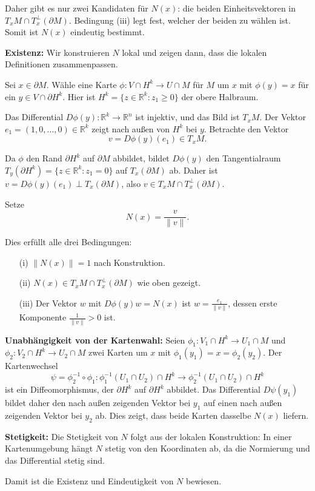 \documentclass{article}
\newcommand{\R}{\mathbb{R}}
\newcommand{\del}{\partial}
\begin{document}
Daher gibt es nur zwei Kandidaten für $N(x)$: die beiden Einheitsvektoren in $T_x M \cap T_x^{\perp}(\del M)$. Bedingung (iii) legt fest, welcher der beiden zu wählen ist. Somit ist $N(x)$ eindeutig bestimmt.

\textbf{Existenz:}
Wir konstruieren $N$ lokal und zeigen dann, dass die lokalen Definitionen zusammenpassen.

Sei $x \in \del M$. Wähle eine Karte $\phi: V \cap H^k \to U \cap M$ für $M$ um $x$ mit $\phi(y) = x$ für ein $y \in V \cap \partial H^k$. Hier ist $H^k = \{z \in \R^k : z_1 \geq 0\}$ der obere Halbraum.

Das Differential $D\phi(y): \R^k \to \R^n$ ist injektiv, und das Bild ist $T_x M$. Der Vektor $e_1 = (1,0,\ldots,0) \in \R^k$ zeigt nach außen von $H^k$ bei $y$. Betrachte den Vektor
\[
v = D\phi(y)(e_1) \in T_x M.
\]

Da $\phi$ den Rand $\partial H^k$ auf $\del M$ abbildet, bildet $D\phi(y)$ den Tangentialraum $T_y(\partial H^k) = \{z \in \R^k : z_1 = 0\}$ auf $T_x(\del M)$ ab. Daher ist $v = D\phi(y)(e_1) \perp T_x(\del M)$, also $v \in T_x M \cap T_x^{\perp}(\del M)$.

Setze
\[
N(x) = \frac{v}{\|v\|}.
\]

Dies erfüllt alle drei Bedingungen:
\begin{itemize}
\item[(i)] $\|N(x)\| = 1$ nach Konstruktion.
\item[(ii)] $N(x) \in T_x M \cap T_x^{\perp}(\del M)$ wie oben gezeigt.
\item[(iii)] Der Vektor $w$ mit $D\phi(y)w = N(x)$ ist $w = \frac{e_1}{\|v\|}$, dessen erste Komponente $\frac{1}{\|v\|} > 0$ ist.
\end{itemize}

\textbf{Unabhängigkeit von der Kartenwahl:}
Seien $\phi_1: V_1 \cap H^k \to U_1 \cap M$ und $\phi_2: V_2 \cap H^k \to U_2 \cap M$ zwei Karten um $x$ mit $\phi_1(y_1) = x = \phi_2(y_2)$. Der Kartenwechsel
\[
\psi = \phi_2^{-1} \circ \phi_1: \phi_1^{-1}(U_1 \cap U_2) \cap H^k \to \phi_2^{-1}(U_1 \cap U_2) \cap H^k
\]
ist ein Diffeomorphismus, der $\partial H^k$ auf $\partial H^k$ abbildet. Das Differential $D\psi(y_1)$ bildet daher den nach außen zeigenden Vektor bei $y_1$ auf einen nach außen zeigenden Vektor bei $y_2$ ab. Dies zeigt, dass beide Karten dasselbe $N(x)$ liefern.

\textbf{Stetigkeit:}
Die Stetigkeit von $N$ folgt aus der lokalen Konstruktion: In einer Kartenumgebung hängt $N$ stetig von den Koordinaten ab, da die Normierung und das Differential stetig sind.

Damit ist die Existenz und Eindeutigkeit von $N$ bewiesen.
\end{document}
